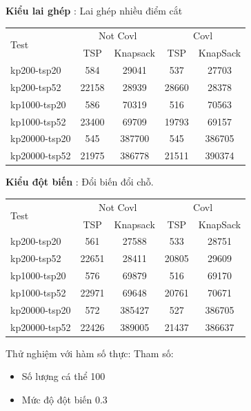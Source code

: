 \documentclass[a4paper,12pt]{report}
\begin{document}
\textbf{Kiểu lai ghép} : Lai ghép nhiều điểm cắt

\begin{longtable}{|l |c |c |c |c|}
\hline
\multirow{2}{*}{Test} 
& \multicolumn{2}{c|}{Not Covl} &\multicolumn{2}{|c|}{Covl} \\
\cline{2-5}
&TSP & Knapsack & TSP & KnapSack \\
\hline
kp200-tsp20  & 584&29041 &537 &27703 
\\ \hline
kp200-tsp52&22158 &28939&28660 &28378 \\ \hline
kp1000-tsp20 &586&70319&516&70563 \\ \hline
kp1000-tsp52 &23400&69709&19793&69157 \\ \hline
kp20000-tsp20 &545&387700&545 &386705 \\ \hline
kp20000-tsp52 &21975&386778&21511& 390374\\ \hline
\end{longtable}
\textbf{Kiểu đột biến} : Đổi biến đổi chỗ.

\begin{longtable}{|l |c |c |c |c|}
\hline
\multirow{2}{*}{Test} 
& \multicolumn{2}{c|}{Not Covl} &\multicolumn{2}{|c|}{Covl} \\
\cline{2-5}
&TSP & Knapsack & TSP & KnapSack \\
\hline
kp200-tsp20  & 561&27588 &533 &28751 
\\ \hline
kp200-tsp52&22651 &28411&20805 &29609 \\ \hline
kp1000-tsp20 &576&69879&516&69170 \\ \hline
kp1000-tsp52 &22971&69648&20761&70671 \\ \hline
kp20000-tsp20 &572&385427&527 &386705 \\ \hline

kp20000-tsp52 &22426 & 389005 & 21437 & 386637\\
\hline
\end{longtable}

Thử nghiệm với hàm số thực:
Tham số:

\begin{itemize}
\item Số lượng cá thể 100
\item Mức độ đột biến 0.3
\end{itemize}
\end{document}
